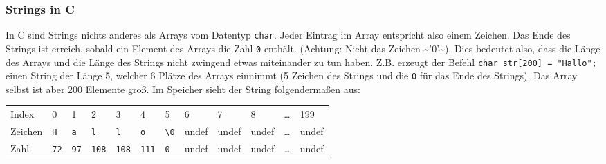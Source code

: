 \documentclass[11pt]{article}
\begin{document}
\subsubsection{Strings in C}
\label{sec-4-6-1}
In C sind Strings nichts anderes als Arrays vom Datentyp \verb~char~. Jeder
Eintrag im Array entspricht also einem Zeichen. Das Ende des Strings
ist erreich, sobald ein Element des Arrays die Zahl \verb~0~ enthält.
(Achtung: Nicht das Zeichen \textasciitilde{}'0'\textasciitilde{}). Dies bedeutet also, dass die Länge
des Arrays und die Länge des Strings nicht zwingend etwas miteinander
zu tun haben. Z.B. erzeugt der Befehl \verb~char str[200] = "Hallo";~ einen
String der Länge 5, welcher 6 Plätze des Arrays einnimmt (5 Zeichen
des Strings und die \verb~0~ für das Ende des Strings). Das Array selbst
ist aber 200 Elemente groß. Im Speicher sieht der String
folgendermaßen aus:
\begin{center}
\begin{tabular}{llllllllllll}
Index & 0 & 1 & 2 & 3 & 4 & 5 & 6 & 7 & 8 & \ldots{} & 199\\
Zeichen & \verb~H~ & \verb~a~ & \verb~l~ & \verb~l~ & \verb~o~ & \verb~\0~ & undef & undef & undef & \ldots{} & undef\\
Zahl & \verb~72~ & \verb~97~ & \verb~108~ & \verb~108~ & \verb~111~ & \verb~0~ & undef & undef & undef & \ldots{} & undef\\
\end{tabular}
\end{center}
\end{document}
